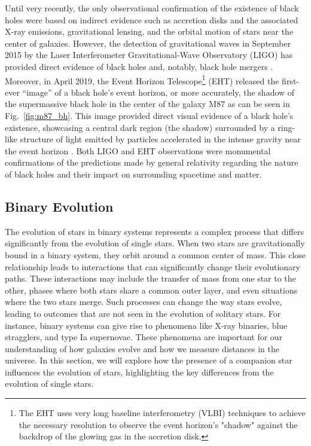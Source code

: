 \documentclass[main.tex]{subfiles}
\begin{document}
    Until very recently, the only observational confirmation of the existence of black holes were based on indirect evidence such as accretion disks and the associated X-ray emissions, gravitational lensing, and the orbital motion of stars near the center of galaxies. However, the detection of gravitational waves in September 2015 by the Laser Interferometer Gravitational-Wave Observatory (LIGO) has provided direct evidence of black holes and, notably, black hole mergers \citep{LIGO:BHmerger}. Moreover, in April 2019, the Event Horizon Telescope\footnote{The EHT uses very long baseline interferometry (VLBI) techniques to achieve the necessary resolution to observe the event horizon's "shadow" against the backdrop of the glowing gas in the accretion disk.} (EHT) released the first-ever ``image'' of a black hole's event horizon, or more accurately, the shadow of the supermassive black hole in the center of the galaxy M87 as can be seen in Fig.~\ref{fig:m87_bh}. This image provided direct visual evidence of a black hole's existence, showcasing a central dark region (the shadow) surrounded by a ring-like structure of light emitted by particles accelerated in the intense gravity near the event horizon \citep{EHT:M87}. Both LIGO and EHT observations were monumental confirmations of the predictions made by general relativity regarding the nature of black holes and their impact on surrounding spacetime and matter.

    \subsection{Binary Evolution}\label{sec:ch1:binaries}
    The evolution of stars in binary systems represents a complex process that differs significantly from the evolution of single stars. When two stars are gravitationally bound in a binary system, they orbit around a common center of mass. This close relationship leads to interactions that can significantly change their evolutionary paths. These interactions may include the transfer of mass from one star to the other, phases where both stars share a common outer layer, and even situations where the two stars merge. Such processes can change the way stars evolve, leading to outcomes that are not seen in the evolution of solitary stars. For instance, binary systems can give rise to phenomena like X-ray binaries, blue stragglers, and type Ia supernovae. These phenomena are important for our understanding of how galaxies evolve and how we measure distances in the universe. In this section, we will explore how the presence of a companion star influences the evolution of stars, highlighting the key differences from the evolution of single stars.
\end{document}
